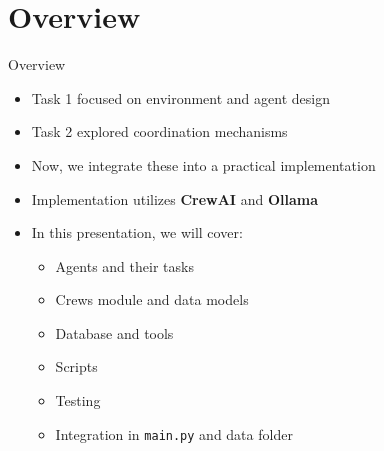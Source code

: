 \section{Overview}
\begin{frame}{Overview}
    \begin{itemize}
        \item Task 1 focused on environment and agent design
        \item Task 2 explored coordination mechanisms
        \item Now, we integrate these into a practical implementation
        \item Implementation utilizes \textbf{CrewAI} and \textbf{Ollama}
        \item In this presentation, we will cover:
        \begin{itemize}
            \item Agents and their tasks
            \item Crews module and data models
            \item Database and tools
            \item Scripts
            \item Testing
            \item Integration in \texttt{main.py} and data folder
        \end{itemize}
    \end{itemize}
\end{frame}
